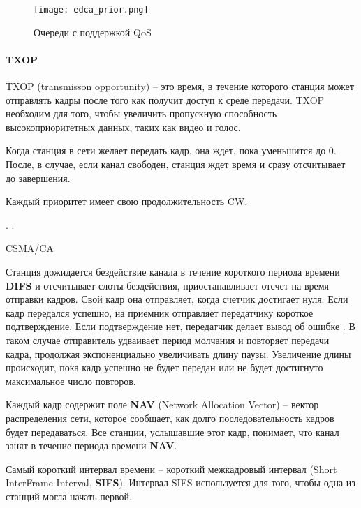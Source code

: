\begin{figure}[h!]
  \centering
   \texttt{[image: edca\_prior.png]}
\caption{Очереди с поддержкой QoS}
\label{fig:part1_edca_prior}
\end{figure}


\paragraph{TXOP}
TXOP (transmisson opportunity) -- это время, в течение которого станция может отправлять кадры после того как получит доступ к среде передачи. TXOP необходим для того, чтобы увеличить пропускную способность высокоприоритетных данных, таких как видео и голос.

Когда станция в сети желает передать кадр, она ждет, пока  уменьшится до 0. После, в случае, если канал свободен, станция ждет время  и сразу отсчитывает  до завершения.

Каждый приоритет имеет свою продолжительность CW.



.
\fixme{======================================================}.
 
CSMA/CA 

Станция дожидается бездействие канала в течение короткого периода времени \textbf{DIFS} и отсчитывает слоты бездействия, приостанавливает отсчет на время отправки кадров. Свой кадр она отправляет, когда счетчик достигает нуля. Если кадр передался успешно, на приемник отправляет передатчику короткое подтверждение. Если подтверждение нет, передатчик делает вывод об ошибке \cite{Tanenbaum2022}. В таком случае отправитель удваивает период молчания и повторяет передачи кадра, продолжая экспоненциально увеличивать длину паузы. Увеличение длины происходит, пока кадр успешно не будет передан или не будет достигнуто максимальное число повторов.


Каждый кадр содержит поле \textbf{NAV} (Network Allocation Vector) -- вектор распределения сети, которое сообщает, как долго последовательность кадров будет передаваться. Все станции, услышавшие этот кадр, понимает, что канал занят в течение периода времени \textbf{NAV}.

Самый короткий интервал времени --  короткий межкадровый интервал (Short InterFrame Interval, \textbf{SIFS}). Интервал SIFS используется для того, чтобы одна из станций могла начать первой. 

